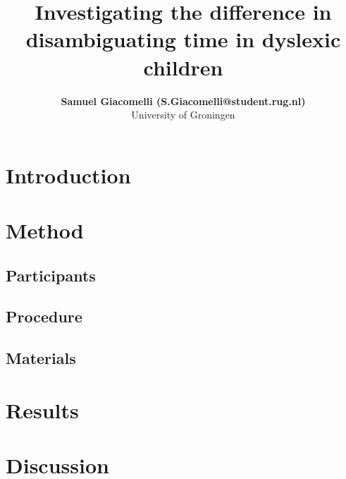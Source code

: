 \documentclass[10pt, a4]{article}
\title{Investigating the difference in disambiguating time in dyslexic children}
\author{{\large \bf Samuel Giacomelli (S.Giacomelli@student.rug.nl)} \\
University of Groningen}
\begin{document}
\maketitle

\begin{abstract}
\blindtext    
\end{abstract}


\section{Introduction}
\blindtext

\section{Method}

\subsection{Participants}
\blindtext

\subsection{Procedure}
\blindtext

\subsection{Materials}
\blindtext

\section{Results}
\blindtext


\section{Discussion}
\blindtext




\setlength{\bibhang}{.125in}
\setlength{\bibindent}{-\bibhang}

\vfill
\pagebreak


\end{document}
